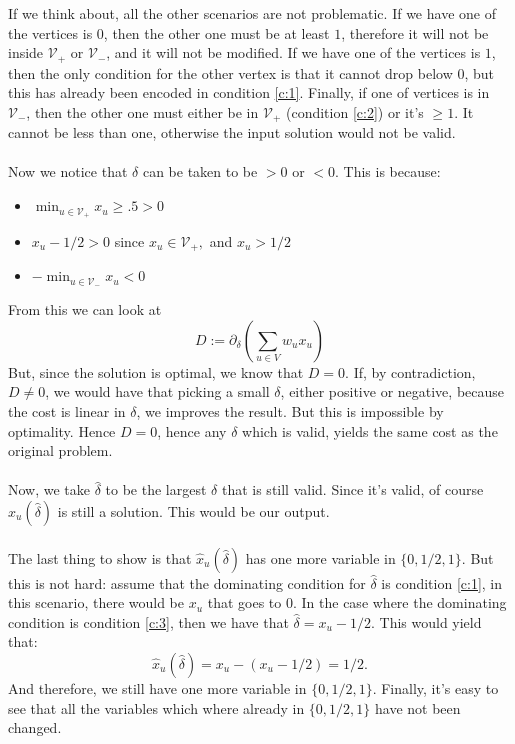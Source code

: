 \documentclass[11pt]{article}
\begin{document}
    If we think about, all the other scenarios are not problematic. If we have one of the vertices is $0$, then the other one must be at least $1$, therefore it will not be inside $\mathcal{V}_+$ or $\mathcal{V}_-$, and it will not be modified. If we have one of the vertices is $1$, then the only condition for the other vertex is that it cannot drop below $0$, but this has already been encoded in condition \ref{c:1}. Finally, if one of vertices is in $\mathcal{V}_-$, then the other one must either be in $\mathcal{V}_+$ (condition \ref{c:2}) or it's $\geq 1$. It cannot be less than one, otherwise the input solution would not be valid.
    \\\\
    Now we notice that $\delta$ can be taken to be $>0$ or $<0$. This is because:
    \begin{itemize}
        \item $\min_{u\in \mathcal{V}_+}x_u \geq .5 > 0$
        \item $x_u-1/2 > 0$ since $x_u \in \mathcal{V}_+,$ and $x_u>1/2$
        \item $-\min_{u\in \mathcal{V}_-}x_u < 0$
    \end{itemize}
    From this we can look at
    \begin{equation*}
        D := \partial_\delta \left(\sum_{u\in V} w_ux_u\right) 
    \end{equation*}
    But, since the solution is optimal, we know that $D=0$. If, by contradiction, $D\neq 0$, we would have that picking a small $\delta$, either positive or negative, because the cost is linear in $\delta$, we improves the result. But this is impossible by optimality. Hence $D = 0$, hence any $\delta$ which is valid, yields the same cost as the original problem.\\\\
    Now, we take $\hat \delta$ to be the largest $\delta$ that is still valid. Since it's valid, of course $\hat x_u (\hat\delta)$ is still a solution. This would be our output.\\\\
    The last thing to show is that $\hat x_u (\hat\delta)$ has one more variable in $\{0,1/2,1\}$. But this is not hard: assume that the dominating condition for $\hat \delta$ is condition \ref{c:1}, in this scenario, there would be $x_u$ that goes to $0$. In the case where the dominating condition is condition \ref{c:3}, then we have that $\hat\delta = x_u -1/2$. This would yield that:
    \begin{equation*}
        \hat x_u(\hat\delta) = x_u-(x_u-1/2) = 1/2.
    \end{equation*}
    And therefore, we still have one more variable in $\{0,1/2,1\}$. Finally, it's easy to see that all the variables which where already in $\{0,1/2,1\}$ have not been changed.
\end{document}
